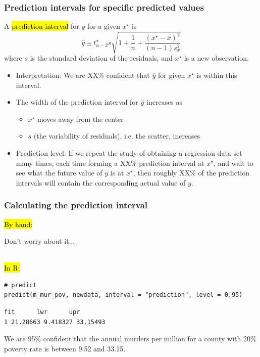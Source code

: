 \documentclass[11pt,containsverbatim,handout,xcolor=xelatex,dvipsnames,table]{beamer}
\begin{document}
\begin{frame}
\frametitle{Prediction intervals for specific predicted values}

A \hl{prediction interval} for $y$ for a given $x^\star$ is
\[ \hat{y} \pm t^\star_{n - 2} s \sqrt{ 1 + \frac{1}{n} + \frac{(x^\star - \bar{x})^2}{(n - 1)s_x^2} } \]
where $s$ is the standard deviation of the residuals, and $x^\star$ is a new observation.

\pause

\begin{itemize}

\item Interpretation: We are XX\% confident that $\hat{y}$ for given $x^\star$ is within this interval.

\pause

\item The width of the prediction interval for $\hat{y}$ increases as
\begin{itemize}
\item $x^\star$ moves away from the center
\item $s$ (the variability of residuals), i.e. the scatter, increases
\end{itemize}

\pause

\item Prediction level: If we repeat the study of obtaining a regression data set many times, each time forming a XX\% prediction 
interval at $x^\star$, and wait to see what the future value of $y$ is at $x^\star$, then roughly XX\% of the prediction intervals will 
contain the corresponding actual value of $y$.

\end{itemize}

\end{frame}


\begin{frame}[fragile]
\frametitle{Calculating the prediction interval}

\hl{By hand:}

Don't worry about it...

\pause

$\:$ \\

\hl{In R:}

{\scriptsize
\begin{Verbatim}[frame=single, formatcom=\color{blue}]
# predict
predict(m_mur_pov, newdata, interval = "prediction", level = 0.95)
\end{Verbatim}
}

\pause

{\scriptsize
\begin{Verbatim}[frame=single, formatcom=\color{gray}]
       fit      lwr      upr
1 21.28663 9.418327 33.15493
\end{Verbatim}
}

\pause

We are 95\% confident that the annual murders per million for a county with 20\%
poverty rate is between 9.52 and 33.15.

\end{frame}
\end{document}
